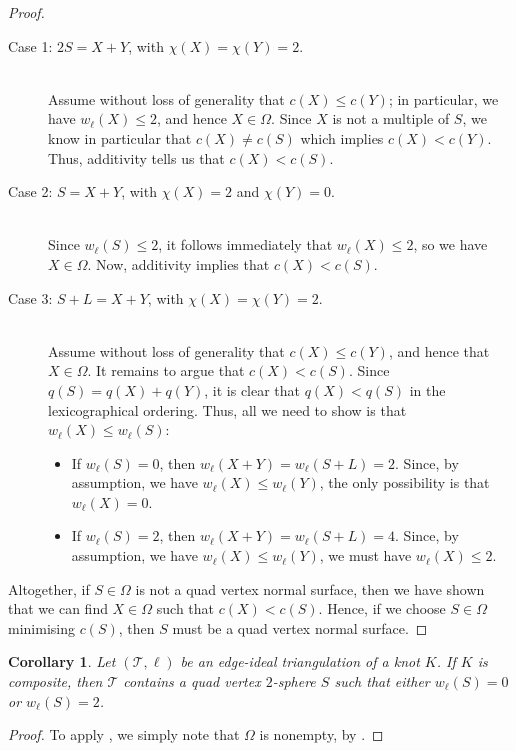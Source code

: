 \documentclass[10pt,a4paper]{amsart}
\newtheorem{corollary}[theorem]{Corollary}
\newcommand{\tri}{\mathcal{T}}
\begin{document}
\begin{proof}
\begin{description}
\item[Case 1: $2S=X+Y$, with $\chi(X)=\chi(Y)=2$.]\hfill\\
Assume without loss of generality that $c(X) \leqslant c(Y)$;
in particular, we have $w_\ell(X) \leqslant 2$, and hence $X \in \Omega$.
Since $X$ is not a multiple of $S$, we know in particular that $c(X) \neq c(S)$ which implies $c(X) < c(Y)$. Thus, additivity tells us that $c(X) < c(S)$.
\item[Case 2: $S=X+Y$, with $\chi(X)=2$ and $\chi(Y)=0$.]\hfill\\
Since $w_\ell(S) \leqslant 2$, it follows immediately that $w_\ell(X) \leqslant 2$, so we have $X \in \Omega$.
Now, additivity implies that $c(X) < c(S)$.
\item[Case 3: $S+L=X+Y$, with $\chi(X) = \chi(Y) = 2$.]\hfill\\
Assume without loss of generality that $c(X) \leqslant c(Y)$, and hence that $X \in \Omega$.
It remains to argue that $c(X) < c(S)$.
Since $q(S) = q(X) + q(Y)$, it is clear that $q(X) < q(S)$ in the lexicographical ordering.
Thus, all we need to show is that $w_\ell(X) \leqslant w_\ell(S)$:
	\begin{itemize}
	\item If $w_\ell(S) = 0$, then $w_\ell(X+Y) = w_\ell(S+L) = 2$.
	Since, by assumption, we have $w_\ell(X) \leqslant w_\ell(Y)$, the only possibility is that $w_\ell(X) = 0$.
	\item If $w_\ell(S) = 2$, then $w_\ell(X+Y) = w_\ell(S+L) = 4$.
	Since, by assumption, we have $w_\ell(X) \leqslant w_\ell(Y)$, we must have $w_\ell(X) \leqslant 2$.
	\end{itemize}
\end{description}

Altogether, if $S \in \Omega$ is not a quad vertex normal surface, then we have shown that we can find $X \in \Omega$ such that $c(X) < c(S)$.
Hence, if we choose $S \in \Omega$ minimising $c(S)$, then $S$ must be
a quad vertex normal surface.
\end{proof}

\begin{corollary}\label{cor:quadVertexComposite}
Let $(\tri,\ell)$ be an edge-ideal triangulation of a knot $K$.
If $K$ is composite, then $\tri$ contains a quad vertex $2$-sphere $S$ such that either $w_\ell(S)=0$ or $w_\ell(S)=2$.
\end{corollary}

\begin{proof}
To apply , we simply note that $\Omega$ is nonempty, by .
\end{proof}
\end{document}
